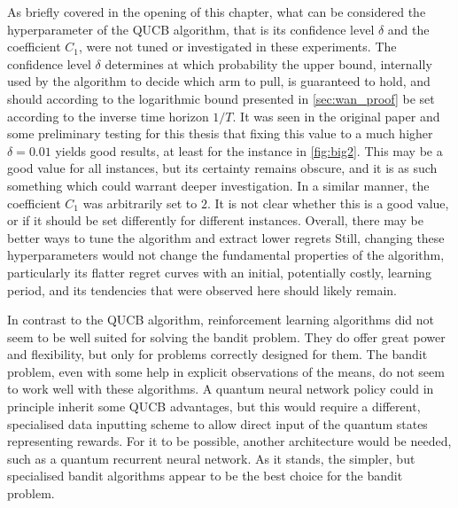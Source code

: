 As briefly covered in the opening of this chapter, what can be considered the hyperparameter of the QUCB algorithm, that is its confidence level $\delta$ and the coefficient $C_1$, were not tuned or investigated in these experiments.
The confidence level $\delta$ determines at which probability the upper bound, internally used by the algorithm to decide which arm to pull, is guaranteed to hold, and should according to the logarithmic bound presented in \cref{sec:wan_proof} be set according to the inverse time horizon $1/T$.
It was seen in the original paper and some preliminary testing for this thesis that fixing this value to a much higher $\delta = 0.01$ yields good results, at least for the instance in \cref{fig:big2}.
This may be a good value for all instances, but its certainty remains obscure, and it is as such something which could warrant deeper investigation.
In a similar manner, the coefficient $C_1$ was arbitrarily set to $2$.
It is not clear whether this is a good value, or if it should be set differently for different instances.
Overall, there may be better ways to tune the algorithm and extract lower regrets
Still, changing these hyperparameters would not change the fundamental properties of the algorithm, particularly its flatter regret curves with an initial, potentially costly, learning period, and its tendencies that were observed here should likely remain.

In contrast to the QUCB algorithm, reinforcement learning algorithms did not seem to be well suited for solving the bandit problem.
They do offer great power and flexibility, but only for problems correctly designed for them.
The bandit problem, even with some help in explicit observations of the means, do not seem to work well with these algorithms.
A quantum neural network policy could in principle inherit some QUCB advantages, but this would require a different, specialised data inputting scheme to allow direct input of the quantum states representing rewards.
For it to be possible, another architecture would be needed, such as a quantum recurrent neural network.
As it stands, the simpler, but specialised bandit algorithms appear to be the best choice for the bandit problem.